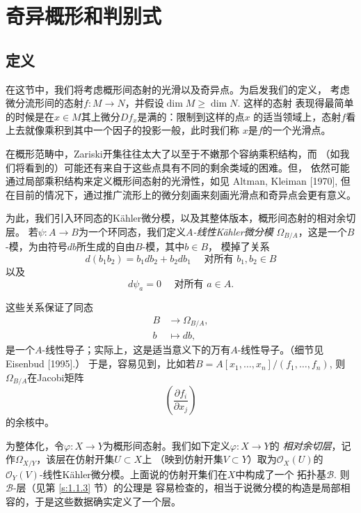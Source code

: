 \section{奇异概形和判别式}\label{s:5.3}

\subsection{定义}\label{s:5.3.1}

在这节中，我们将考虑概形间态射的光滑以及奇异点。为启发我们的定义，
考虑微分流形间的态射$f:M\to N$，并假设$\dim M\geq \dim N$. 这样的态射
表现得最简单的时候是在$x\in M$其上微分$Df_x$是满的：限制到这样的点$x$
的适当领域上，态射$f$看上去就像乘积到其中一个因子的投影一般，此时我们称
$x$是$f$的一个光滑点。

在概形范畴中，Zariski开集往往太大了以至于不嫩那个容纳乘积结构，而
（如我们将看到的）可能还有来自于这些点具有不同的剩余类域的困难。但，
依然可能通过局部乘积结构来定义概形间态射的光滑性，如见 Altman, Kleiman [1970],
但在目前的情况下，通过推广流形上的微分刻画来刻画光滑点和奇异点会更有意义。

为此，我们引入环同态的K\"ahler微分模，以及其整体版本，概形间态射的相对余切层。
若$\psi:A\to B$为一个环同态，我们定义\textit{$A$-线性K\"ahler微分模}
$\Omega_{B/A}$，这是一个$B$-模，为由符号$db$所生成的自由$B$-模，其中$b\in B$，
模掉了关系
\[
    d(b_1 b_2)=b_1 d b_2+b_2 d b_1 \quad \text { 对所有 } b_1, b_2 \in B
\]
以及 
\[
    d \psi_a=0 \quad \text { 对所有 } a \in A.
\]

这些关系保证了同态
\[
    \begin{aligned}
        B & \longrightarrow \Omega_{B / A}, \\
        b & \longmapsto d b,
    \end{aligned}
\]
是一个$A$-线性导子；实际上，这是适当意义下的万有$A$-线性导子。（细节见
Eisenbud [1995].） 于是，容易见到，比如若$B=A[x_1,\dots,x_n]/(f_1,\dots,f_n)$,
则$\Omega_{B/A}$在Jacobi矩阵
\[
    \left(\frac{\partial f_i}{\partial x_j}\right)
\]
的余核中。

为整体化，令$\varphi:X\to Y$为概形间态射。我们如下定义$\varphi:X\to Y$的
\textit{相对余切层}，记作$\Omega_{X/Y}$，该层在仿射开集$U\subset X$上
（映到仿射开集$V\subset Y$）取为$\mathscr O_X(U)$的
$\mathscr O_Y(V)$-线性K\"ahler微分模。上面说的仿射开集们在$X$中构成了一个
拓扑基$\mathscr B$. 则$\mathscr B$-层（见第 \ref{s:1.1.3} 节）的公理是
容易检查的，相当于说微分模的构造是局部相容的，于是这些数据确实定义了一个层。


